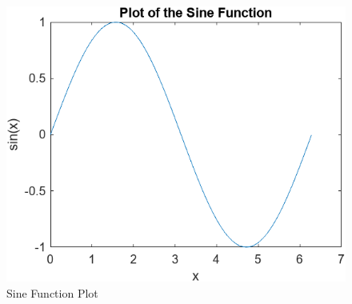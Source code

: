 \documentclass[
11pt, %
a4paper, %
oneside, %
headinclude,footinclude, %
BCOR5mm, %
]{scrartcl}
\begin{document}
\begin{figure}[H]
\centering %
\includegraphics[width=0.4\columnwidth]{Figures/Figure1.png} 
\caption[Sine Function Plot]{Sine Function Plot} %
\label{fig:gallery} 
\end{figure}

\renewcommand{\refname}{\spacedlowsmallcaps{References}} %
\raggedright



\end{document}

